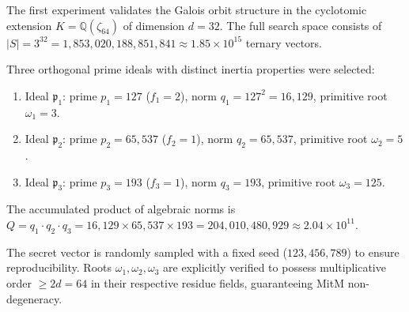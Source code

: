 \documentclass[11pt,a4paper]{article}
\theoremstyle{plain}
\theoremstyle{definition}
\numberwithin{equation}{section}
\newcommand{\QQ}{\mathbb{Q}}
\newcommand{\fkp}{\mathfrak{p}}
\begin{document}
The first experiment validates the Galois orbit structure in the cyclotomic extension $K = \QQ(\zeta_{64})$ of dimension $d=32$. The full search space consists of $|S| = 3^{32} = 1{,}853{,}020{,}188{,}851{,}841 \approx 1.85 \times 10^{15}$ ternary vectors.

Three orthogonal prime ideals with distinct inertia properties were selected:
\begin{enumerate}
    \item Ideal $\fkp_1$: prime $p_1 = 127$ ($f_1 = 2$), norm $q_1 = 127^2 = 16{,}129$, primitive root $\omega_1 = 3$.
    \item Ideal $\fkp_2$: prime $p_2 = 65{,}537$ ($f_2 = 1$), norm $q_2 = 65{,}537$, primitive root $\omega_2 = 5$.
    \item Ideal $\fkp_3$: prime $p_3 = 193$ ($f_3 = 1$), norm $q_3 = 193$, primitive root $\omega_3 = 125$.
\end{enumerate}

The accumulated product of algebraic norms is $Q = q_1 \cdot q_2 \cdot q_3 = 16{,}129 \times 65{,}537 \times 193 = 204{,}010{,}480{,}929 \approx 2.04 \times 10^{11}$.

The secret vector is randomly sampled with a fixed seed ($123{,}456{,}789$) to ensure reproducibility. Roots $\omega_1, \omega_2, \omega_3$ are explicitly verified to possess multiplicative order $\ge 2d = 64$ in their respective residue fields, guaranteeing MitM non-degeneracy.
\end{document}
